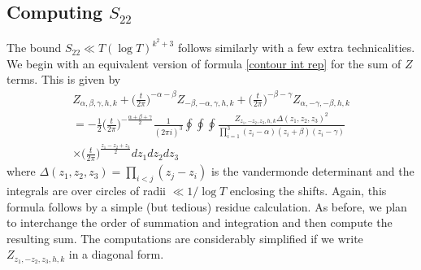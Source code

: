 \documentclass[oneside, 12pt]{amsart}
\theoremstyle{definition}
\begin{document}
\subsection{Computing $S_{22}$} The bound $S_{22}\ll T(\log T)^{k^2+3}$ follows similarly with a few extra technicalities. We begin with an equivalent version of formula \eqref{contour int rep} for the sum of $Z$ terms. This is given by 
\begin{multline}
\label{contour int rep 2}
Z_{\alpha,\beta,\gamma,h,k}+\bigg(\frac{t}{2\pi }\bigg)^{-\alpha-\beta}Z_{-\beta,-\alpha,\gamma,h,k}+\bigg(\frac{t}{2\pi }\bigg)^{-\beta-\gamma}Z_{\alpha,-\gamma,-\beta,h,k}
\\ =
-\frac{1}{2}\bigg(\frac{t}{2\pi}\bigg)^{-\frac{\alpha+\beta+\gamma}{2}}
\frac{1}{(2\pi i)^3}\oint\oint\oint 
\frac{Z_{z_1,-z_2,z_3,h,k}\Delta(z_1,z_2,z_3)^2}{\prod_{i=1}^3(z_i-\alpha)(z_i+\beta)(z_i-\gamma)}
\\
\times
\bigg(\frac{t}{2\pi}\bigg)^{\frac{z_1-z_2+z_3}{2}}dz_1dz_2dz_3
\end{multline}
where $\Delta(z_1,z_2,z_3)=\prod_{i<j}(z_j-z_i)$ is the vandermonde determinant and the integrals are over circles of radii $\ll 1/\log T$ enclosing the shifts.
Again, this formula follows by a simple (but tedious) residue calculation. As before, we plan to interchange the order of summation and integration and then compute the resulting sum. The computations are considerably simplified if we write $Z_{z_1,-z_2,z_3,h,k}$  in a diagonal form.
\end{document}
